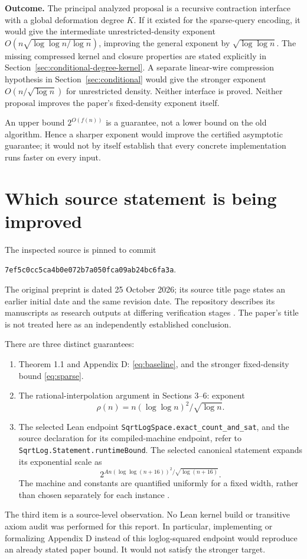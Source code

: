 \documentclass[11pt,letterpaper]{article}
\newcommand{\pin}{\texttt{7ef5c0cc5ca4b0e072b7a050fca09ab24bc6fa3a}}
\theoremstyle{remark}\newtheorem*{scope}{Scope}
\begin{document}
\textbf{Outcome.} The principal analyzed proposal is a recursive contraction interface with a global deformation degree $K$. If it existed for the sparse-query encoding, it would give the intermediate unrestricted-density exponent $O(n\sqrt{\log\log n/\log n})$, improving the general exponent by $\sqrt{\log\log n}$. The missing compressed kernel and closure properties are stated explicitly in Section~\ref{sec:conditional-degree-kernel}. A separate linear-wire compression hypothesis in Section~\ref{sec:conditional} would give the stronger exponent $O(n/\sqrt{\log n})$ for unrestricted density. Neither interface is proved. Neither proposal improves the paper's fixed-density exponent itself.

An upper bound $2^{O(f(n))}$ is a guarantee, not a lower bound on the old algorithm. Hence a sharper exponent would improve the certified asymptotic guarantee; it would not by itself establish that every concrete implementation runs faster on every input.

\section{Which source statement is being improved}
The inspected source is pinned to commit
\begin{center}\small\pin.\end{center}
The original preprint is dated 25 October 2026; its source title page states an earlier initial date and the same revision date. The repository describes its manuscripts as research outputs at differing verification stages \cite{repository}. The paper's title is not treated here as an independently established conclusion.

There are three distinct guarantees:
\begin{enumerate}
\item Theorem 1.1 and Appendix D: \eqref{eq:baseline}, and the stronger fixed-density bound \eqref{eq:sparse}.
\item The rational-interpolation argument in Sections 3--6: exponent
\[
 \rho(n)=n(\log\log n)^2/\sqrt{\log n}.
\]
\item The selected Lean endpoint \texttt{SqrtLogSpace.exact\_count\_and\_sat}, and the source declaration for its compiled-machine endpoint, refer to \texttt{SqrtLog.Statement.runtimeBound}. The selected canonical statement expands its exponential scale as
\[
 2^{A n (\log\log(n+16))^2/\sqrt{\log(n+16)}}.
\]
The machine and constants are quantified uniformly for a fixed width, rather than chosen separately for each instance \cite{leanfinal,leanstatement}.
\end{enumerate}
The third item is a source-level observation. No Lean kernel build or transitive axiom audit was performed for this report. In particular, implementing or formalizing Appendix D instead of this loglog-squared endpoint would reproduce an already stated paper bound. It would not satisfy the stronger target.
\end{document}
